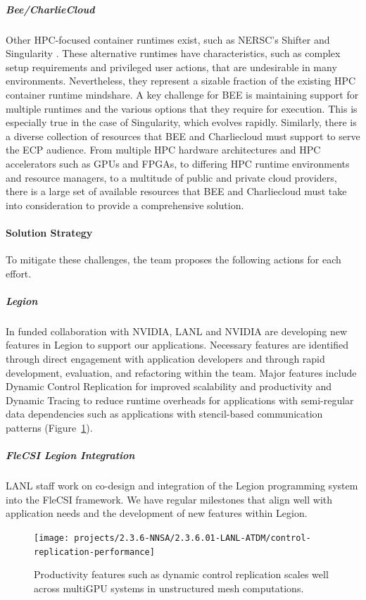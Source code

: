 \subparagraph{Bee/CharlieCloud}
Other HPC-focused container runtimes exist, such as NERSC's Shifter
\cite{canonrsjacobsend} and
Singularity \cite{kurtzergmsochatvbauermw}.  These alternative runtimes have characteristics, such as
complex setup requirements and privileged user actions, that are undesirable in
many environments.  Nevertheless, they represent a sizable fraction of the
existing HPC container runtime mindshare.  A key challenge for BEE is
maintaining support for multiple runtimes and the various options that they require
for execution.  This is especially true in the case of Singularity, which
evolves rapidly.  Similarly, there is a diverse collection of resources that
BEE and Charliecloud must support to serve the ECP audience.  From multiple HPC
hardware architectures and HPC accelerators such as GPUs and FPGAs, to
differing HPC runtime environments and resource managers, to a multitude of
public and private cloud providers, there is a large set of available resources
that BEE and Charliecloud must take into consideration to provide a
comprehensive solution.

\paragraph{Solution Strategy} %
To mitigate these challenges, the team proposes the following actions for each effort.

\subparagraph{Legion}
In funded collaboration with NVIDIA, LANL and NVIDIA are developing new features in Legion to support our applications. Necessary features are identified through direct engagement with application developers and through rapid development, evaluation, and refactoring within the team. Major features include Dynamic Control Replication for improved scalability and productivity and Dynamic Tracing to reduce runtime overheads for  applications with semi-regular data dependencies such as applications with stencil-based communication patterns (Figure~\ref{fig:control-replication-performance}). 


\subparagraph{FleCSI Legion Integration}
LANL staff work on co-design and integration of the Legion programming system into the FleCSI framework. We have regular milestones that align well with application needs and the development of new features within Legion. 


\begin{figure}[htb]
  \centering
  \texttt{[image: projects/2.3.6-NNSA/2.3.6.01-LANL-ATDM/control-replication-performance]}
        \caption{\label{fig:control-replication-performance}Productivity features such as dynamic control replication scales well across multiGPU systems in unstructured mesh computations.}
\end{figure}

